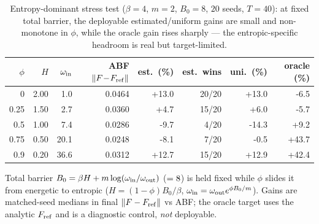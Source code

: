 \begin{table}[t]
\centering
\small
\caption{Entropy-dominant stress test ($\beta=4$, $m=2$, $B_0=8$, $20$ seeds, $T=40$): at fixed total barrier, the deployable estimated/uniform gains are small and non-monotone in $\phi$, while the oracle gain rises sharply --- the entropic-specific headroom is real but target-limited.}
\label{tab:edb}
\begin{tabular}{rrrrrrrr}
\toprule
$\phi$ & $H$ & $\omega_{\rm in}$ & ABF $\|F\!-\!F_{\rm ref}\|$ & est.\ (\%) & est.\ wins & uni.\ (\%) & oracle (\%) \\
\midrule
0 & 2.00 & 1.0 & 0.0464 & +13.0 & 20/20 & +13.0 & -6.5 \\
0.25 & 1.50 & 2.7 & 0.0360 & +4.7 & 15/20 & +6.0 & -5.7 \\
0.5 & 1.00 & 7.4 & 0.0286 & -9.7 & 4/20 & -14.3 & +9.2 \\
0.75 & 0.50 & 20.1 & 0.0248 & -8.1 & 7/20 & -0.5 & +43.7 \\
0.9 & 0.20 & 36.6 & 0.0312 & +12.7 & 15/20 & +12.9 & +42.4 \\
\bottomrule
\end{tabular}
\par\smallskip\footnotesize Total barrier $B_0=\beta H+m\log(\omega_{\rm in}/\omega_{\rm out})$ ($=8$) is held fixed while $\phi$ slides it from energetic to entropic ($H=(1-\phi)B_0/\beta$, $\omega_{\rm in}=\omega_{\rm out}e^{\phi B_0/m}$). Gains are matched-seed medians in final $\|F-F_{\rm ref}\|$ vs ABF; the oracle target uses the analytic $F_{\rm ref}$ and is a diagnostic control, \emph{not} deployable.
\end{table}

